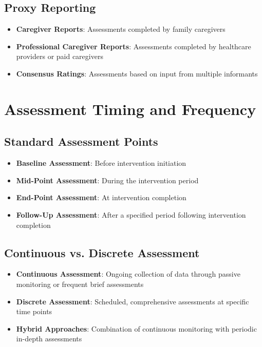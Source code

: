 \subsection{Proxy Reporting}
\begin{itemize}
    \item \textbf{Caregiver Reports}: Assessments completed by family caregivers
    
    \item \textbf{Professional Caregiver Reports}: Assessments completed by healthcare providers or paid caregivers
    
    \item \textbf{Consensus Ratings}: Assessments based on input from multiple informants
\end{itemize}

\section{Assessment Timing and Frequency}
\subsection{Standard Assessment Points}
\begin{itemize}
    \item \textbf{Baseline Assessment}: Before intervention initiation
    
    \item \textbf{Mid-Point Assessment}: During the intervention period
    
    \item \textbf{End-Point Assessment}: At intervention completion
    
    \item \textbf{Follow-Up Assessment}: After a specified period following intervention completion
\end{itemize}

\subsection{Continuous vs. Discrete Assessment}
\begin{itemize}
    \item \textbf{Continuous Assessment}: Ongoing collection of data through passive monitoring or frequent brief assessments
    
    \item \textbf{Discrete Assessment}: Scheduled, comprehensive assessments at specific time points
    
    \item \textbf{Hybrid Approaches}: Combination of continuous monitoring with periodic in-depth assessments
\end{itemize}

